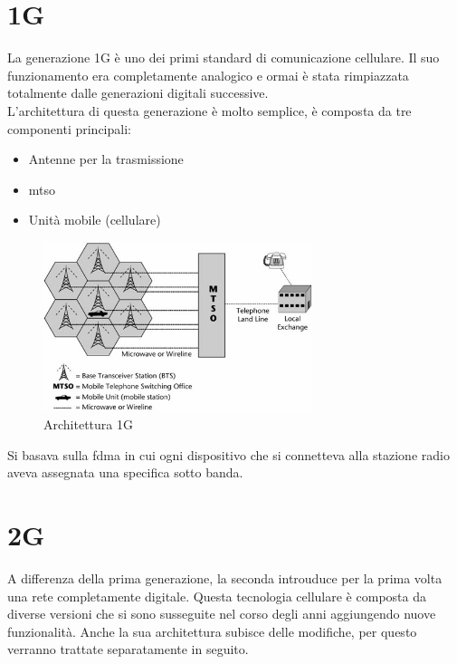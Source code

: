 \section{1G}
La generazione 1G è uno dei primi standard di comunicazione cellulare. Il suo funzionamento era completamente analogico 
e ormai è stata rimpiazzata totalmente dalle generazioni digitali successive.\\
L'architettura di questa generazione è molto semplice, è composta da tre componenti principali:
\begin{itemize}
    \item Antenne per la trasmissione
    \item \gls{mtso}
    \item Unità mobile (cellulare)
\end{itemize}
\begin{figure}[ht]
    \centering
    \includegraphics[width=0.7\textwidth]{images/1g.jpg}
    \caption{Architettura 1G}
\end{figure}
Si basava sulla \gls{fdma} in cui ogni dispositivo che si connetteva alla stazione radio
aveva assegnata una specifica sotto banda\cite{generations}.

\clearpage

\section{2G}
A differenza della prima generazione, la seconda introuduce per la prima volta una rete completamente digitale.
Questa tecnologia cellulare è composta da diverse versioni che si sono susseguite nel corso degli anni aggiungendo nuove 
funzionalità.
Anche la sua architettura subisce delle modifiche, per questo verranno trattate separatamente in seguito.
